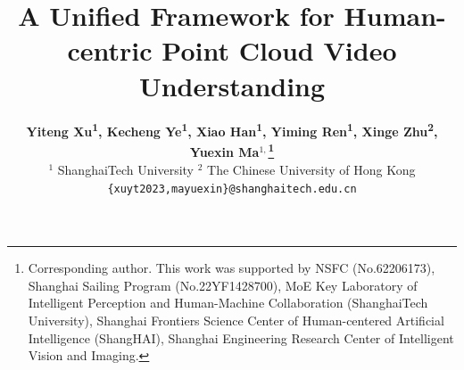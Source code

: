 \documentclass[10pt,twocolumn,letterpaper]{article}
\title{A Unified Framework for Human-centric Point Cloud Video Understanding}
\author{\textbf{
Yiteng Xu\textsuperscript{\rm 1},
Kecheng Ye\textsuperscript{\rm 1},
Xiao Han\textsuperscript{\rm 1},
Yiming Ren\textsuperscript{\rm 1},
Xinge Zhu\textsuperscript{\rm 2},
Yuexin Ma$^{1,}$\thanks{Corresponding author. This work was supported by NSFC (No.62206173), Shanghai Sailing Program (No.22YF1428700), MoE Key Laboratory of Intelligent Perception and Human-Machine Collaboration (ShanghaiTech University), Shanghai Frontiers Science Center of Human-centered Artificial Intelligence (ShangHAI), Shanghai Engineering Research Center of Intelligent Vision and Imaging.}
}\\ 
$^{1}$ ShanghaiTech University
$^{2}$ The Chinese University of Hong Kong \\
{\tt\small \{xuyt2023,mayuexin\}@shanghaitech.edu.cn}}
\begin{document}
\maketitle
    





{
    \small
    
    
}

% 
\end{document}
